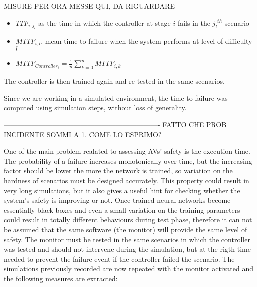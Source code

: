 MISURE PER ORA MESSE QUI, DA RIGUARDARE


\begin{itemize}
	\item $TTF_{i,j_{l}}$ as the time in which the controller at stage $i$ fails in the ${j_{l}}^{th}$ scenario
	\item $MTTF_{i,l}$, mean time to failure when the system performs at level of difficulty $l$
	\item $MTTF_{Controller_{i}} = \frac{1}{n} \sum_{k = 0}^{n} MTTF_{i,k}$
\end{itemize}

The controller is then trained again and re-tested in the same scenarios.

Since we are working in a simulated environment, the time to failure was computed using simulation steps, without loss of generality.\newline 

-------------------------------------------------------------------        FATTO CHE PROB INCIDENTE SOMMI A 1. COME LO ESPRIMO?\newline

One of the main problem realated to assessing AVs' safety is the execution time. The probability of a failure increases monotonically over time, but the increasing factor should be lower the more the network is trained, so variation on the hardness of scenarios must be designed accurately. This property could result in very long simulations, but it also gives a useful hint for checking whether the system's safety is improving or not. \newline\newline
Once trained neural networks become essentially black boxes and even a small variation on the training parameters could result in totally different behaviours during test phase, therefore it can not be assumed that the same software (the monitor) will provide the same level of safety.\newline
The monitor must be tested in the same scenarios in which the controller was tested and should not intervene during the simulation, but at the rigth time needed to prevent the failure event if the controller failed the scenario. The simulations previously recorded are now repeated with the monitor activated and the following measures are extracted:

